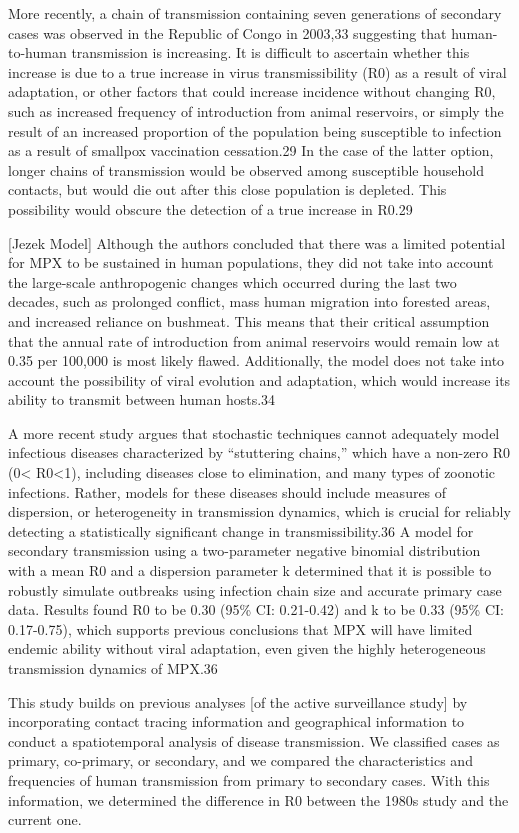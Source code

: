 More recently, a chain of transmission containing seven generations of secondary cases was observed in the Republic of Congo in 2003,33 suggesting that human-to-human transmission is increasing. It is difficult to ascertain whether this increase is due to a true increase in virus transmissibility (R0) as a result of viral adaptation, or other factors that could increase incidence without changing R0, such as increased frequency of introduction from animal reservoirs, or simply the result of an increased proportion of the population being susceptible to infection as a result of smallpox vaccination cessation.29 In the case of the latter option, longer chains of transmission would be observed among susceptible household contacts, but would die out after this close population is depleted. This possibility would obscure the detection of a true increase in R0.29

[Jezek Model] Although the authors concluded that there was a limited potential for MPX to be sustained in human populations, they did not take into account the large-scale anthropogenic changes which occurred during the last two decades, such as prolonged conflict, mass human migration into forested areas, and increased reliance on bushmeat. This means that their critical assumption that the annual rate of introduction from animal reservoirs would remain low at 0.35 per 100,000 is most likely flawed. Additionally, the model does not take into account the possibility of viral evolution and adaptation, which would increase its ability to transmit between human hosts.34

A more recent study argues that stochastic techniques cannot adequately model infectious diseases characterized by “stuttering chains,” which have a non-zero R0 (0< R0<1), including diseases close to elimination, and many types of zoonotic infections. Rather, models for these diseases should include measures of dispersion, or heterogeneity in transmission dynamics, which is crucial for reliably detecting a statistically significant change in transmissibility.36 A model for secondary transmission using a two-parameter negative binomial distribution with a mean R0 and a dispersion parameter k determined that it is possible to robustly simulate outbreaks using infection chain size and accurate primary case data. Results found R0 to be 0.30 (95\% CI: 0.21-0.42) and k to be 0.33 (95\% CI: 0.17-0.75), which supports previous conclusions that MPX will have limited endemic ability without viral adaptation, even given the highly heterogeneous transmission dynamics of MPX.36

This study builds on previous analyses [of the active surveillance study] by incorporating contact tracing information and geographical information to conduct a spatiotemporal analysis of disease transmission. We classified cases as primary, co-primary, or secondary, and we compared the characteristics and frequencies of human transmission from primary to secondary cases. With this information, we determined the difference in R0 between the 1980s study and the current one. 

